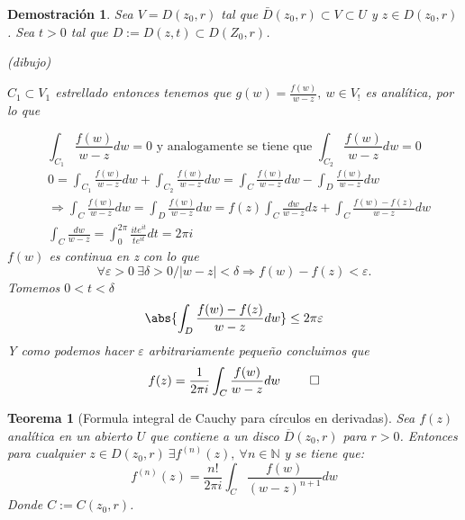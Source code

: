 \documentclass[10pt]{book}
\newtheorem{theorem}{Teorema}[chapter]
\newtheorem*{dem}{Demostración}
\newcommand{\N}{\mathbb{N}}
\begin{document}
\begin{dem}
Sea $V = D(z_0,r)$ tal que $\bar{D}(z_0,r)\subset V\subset U$ y $z\in D(z_0,r)$. Sea $t>0$ tal que $D:= D(z,t)\subset D(Z_0,r)$.

(dibujo)

$C_1 \subset V_1$ estrellado entonces tenemos que $g(w) = \frac{f(w)}{w-z},\ w\in V_!$ es analítica, por lo que

$$\int_{C_1} \frac{f(w)}{w-z} dw = 0 \text{ y analogamente se tiene que } \int_{C_2} \frac{f(w)}{w-z} dw = 0$$
\begin{align*}
&0 = \int_{C_1} \frac{f(w)}{w-z} dw + \int_{C_2} \frac{f(w)}{w-z} dw = \int_{C} \frac{f(w)}{w-z} dw - \int_{D} \frac{f(w)}{w-z} dw\\
&\Rightarrow \int_{C} \frac{f(w)}{w-z} dw = \int_{D} \frac{f(w)}{w-z} dw = f(z) \int_C\frac{dw}{w-z}dz + \int_C\frac{f(w)-f(z)}{w-z}dw\\
&\int_{C} \frac{dw}{w-z} = \int_0^{2\pi} \frac{ite^{it}}{te^{it}}dt = 2\pi i
\end{align*}
$f(w)$ es continua en z con lo que $$\forall \varepsilon>0 \ \exists \delta>0 / |w-z|<\delta \Rightarrow f(w)-f(z)<\varepsilon .$$ Tomemos $0<t<\delta$
$$\abs{\int_D\frac{f(w)-f(z)}{w-z}dw} \leq  2\pi \varepsilon$$
Y como podemos hacer $\varepsilon$ arbitrariamente pequeño concluimos que 
$$
f(z) = \frac{1}{2\pi i}\int_C \frac{f(w)}{w-z}dw\ \qed
$$
\end{dem}


\begin{theorem}[Formula integral de Cauchy para círculos en derivadas]
Sea $f(z)$ analítica en un abierto $U$ que contiene a un disco $\overline{D}(z_0,r)$ para $r>0$. Entonces para cualquier $z \in D(z_0,r)\ \exists f^{(n)}(z),\ \forall n\in \N$ y se tiene que:
$$
f^{(n)}(z) = \frac{n!}{2\pi i}\int_C \frac{f(w)}{(w-z)^{n+1}}dw
$$
Donde $C:= C(z_0,r)$.
\end{theorem}
\end{document}
